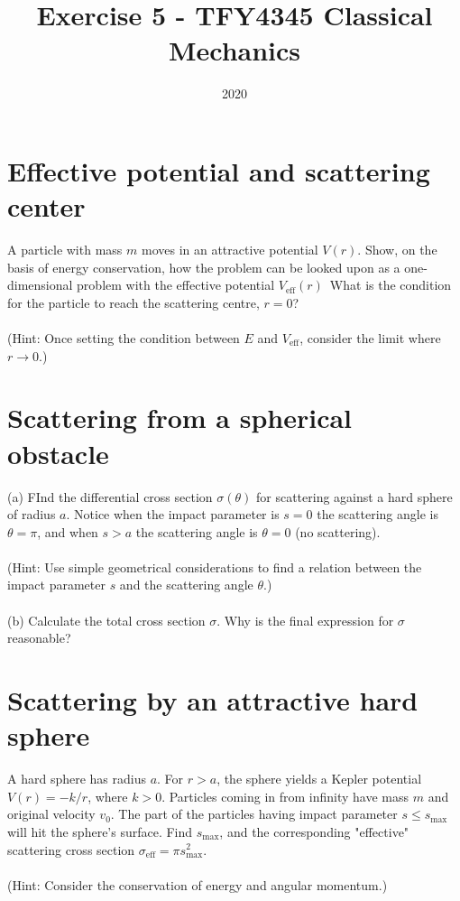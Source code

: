 \documentclass{article}
\title{Exercise 5 - TFY4345 Classical Mechanics}
\date{2020}
\begin{document}
    \maketitle
    \section{Effective potential and scattering center}
        A particle with mass $m$ moves in an attractive potential $V(r)$. Show, on the basis of energy conservation, how the problem can be looked upon as a one-dimensional problem with the effective potential $V_\mathrm{eff}(r)$ What is the condition for the particle to reach the scattering centre, $r=0$? \\ \\
    (Hint: Once setting the condition between $E$ and $V_\mathrm{eff}$, consider the limit where $r \rightarrow 0$.)

    \section{Scattering from a spherical obstacle}
        (a) FInd the differential cross section $\sigma(\theta)$ for scattering against a hard sphere of radius $a$. Notice when the impact parameter is $s = 0$ the scattering angle is $\theta = \pi$, and when $s > a$ the scattering angle is $\theta = 0$ (no scattering). \\ \\
        (Hint: Use simple geometrical considerations to find a relation between the impact parameter $s$ and the scattering angle $\theta$.) \\ \\
        (b) Calculate the total cross section $\sigma$. Why is the final expression for $\sigma$ reasonable?

    \section{Scattering by an attractive hard sphere}
        A hard sphere has radius $a$. For $r > a$, the sphere yields a Kepler potential $V(r) = - k/r$, where $k>0$. Particles coming in from infinity have mass $m$ and original velocity $v_0$. The part of the particles having impact parameter $s \leq s_{\mathrm{max}}$ will hit the sphere's surface. Find $s_{\mathrm{max}}$, and the corresponding "effective" scattering cross section $\sigma_\mathrm{eff} = \pi s_{\mathrm{max}}^2$. \\ \\
        (Hint: Consider the conservation of energy and angular momentum.)
\end{document}
